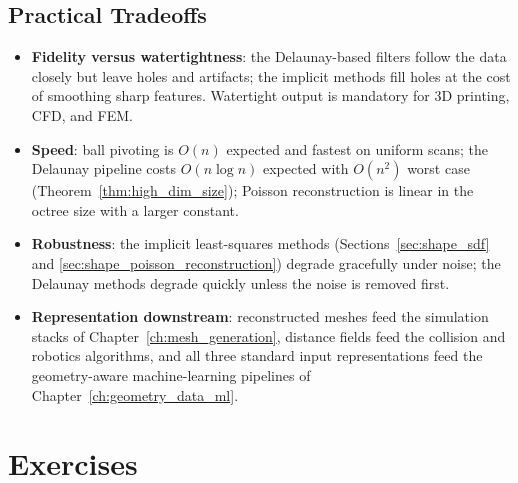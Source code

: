\subsection{Practical Tradeoffs}

\begin{itemize}
  \item \textbf{Fidelity versus watertightness}: the Delaunay-based filters
    follow the data closely but leave holes and artifacts; the implicit methods
    fill holes at the cost of smoothing sharp features. Watertight output is
    mandatory for 3D printing, CFD, and FEM.
  \item \textbf{Speed}: ball pivoting is $O(n)$ expected and fastest on uniform
    scans; the Delaunay pipeline costs $O(n \log n)$ expected with $O(n^2)$
    worst case (Theorem~\ref{thm:high_dim_size}); Poisson reconstruction is
    linear in the octree size with a larger constant.
  \item \textbf{Robustness}: the implicit least-squares methods
    (Sections~\ref{sec:shape_sdf} and \ref{sec:shape_poisson_reconstruction})
    degrade gracefully under noise; the Delaunay methods degrade quickly unless
    the noise is removed first.
  \item \textbf{Representation downstream}: reconstructed meshes feed the
    simulation stacks of Chapter~\ref{ch:mesh_generation}, distance fields
    feed the collision and robotics algorithms, and all three standard input
    representations feed the geometry-aware machine-learning pipelines of
    Chapter~\ref{ch:geometry_data_ml}.
\end{itemize}


\section{Exercises}
\label{sec:shape_exercises}

